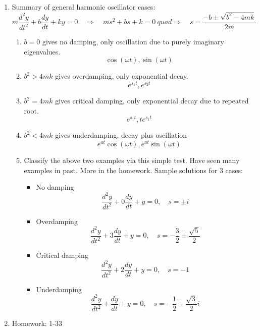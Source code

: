 \documentclass{article}
\begin{document}
\begin{enumerate}
\item Summary of general harmonic oscillator cases:
\[
m \frac{d^2 y}{dt^2} + b \frac{dy}{dt} + k y =0 \quad \Rightarrow \quad ms^2 + bs + k = 0 \ quad \Rightarrow \quad s = \frac{-b \pm \sqrt{b^2-4mk}}{2m}
\]
\begin{enumerate}
\item $b = 0$ gives no damping, only oscillation due to purely imaginary eigenvalues.
\[
\cos(\omega t), \sin(\omega t)
\]
\item $b^2>4mk$ gives overdamping, only exponential decay.
\[
e^{s_1 t}, e^{s_2 t}
\]
\item $b^2=4mk$ gives critical damping, only exponential decay due to repeated root.
\[
e^{s_1 t}, te^{s_1 t}
\]
\item $b^2<4mk$ gives underdamping, decay plus oscillation
\[
e^{at} \cos(\omega t), e^{at} \sin(\omega t)
\]
\item Classify the above two examples via this simple test. Have seen many examples in past. More in the homework. Sample solutions for 3 cases:
\begin{itemize}
\item No damping
\[
\frac{d^2y}{dt^2} + 0 \frac{dy}{dt} + y = 0, \quad s=\pm i
\]
\item Overdamping
\[
\frac{d^2y}{dt^2} + 3 \frac{dy}{dt} + y = 0, \quad s=-\frac{3}{2} \pm \frac{\sqrt{5}}{2} 
\]
\item Critical damping
\[
\frac{d^2y}{dt^2} + 2 \frac{dy}{dt} + y = 0, \quad s=-1
\]
\item Underdamping
\[
\frac{d^2y}{dt^2} + \frac{dy}{dt} + y = 0, \quad s=-\frac{1}{2} \pm \frac{\sqrt{3}}{2} i
\]
\end{itemize}
\end{enumerate}

\item Homework: 1-33

\end{enumerate}

\end{document}
